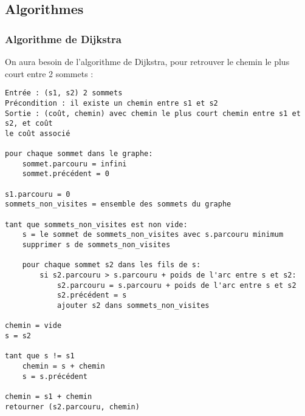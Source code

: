 \documentclass{scrartcl}
\begin{document}
  \subsection{Algorithmes}
    \subsubsection{Algorithme de Dijkstra}
      On aura besoin de l'algorithme de Dijkstra, pour retrouver le chemin
      le plus court entre 2 sommets :

      \begin{lstlisting}
Entrée : (s1, s2) 2 sommets
Précondition : il existe un chemin entre s1 et s2
Sortie : (coût, chemin) avec chemin le plus court chemin entre s1 et s2, et coût
le coût associé

pour chaque sommet dans le graphe:
    sommet.parcouru = infini
    sommet.précédent = 0

s1.parcouru = 0
sommets_non_visites = ensemble des sommets du graphe

tant que sommets_non_visites est non vide:
    s = le sommet de sommets_non_visites avec s.parcouru minimum
    supprimer s de sommets_non_visites

    pour chaque sommet s2 dans les fils de s:
        si s2.parcouru > s.parcouru + poids de l'arc entre s et s2:
            s2.parcouru = s.parcouru + poids de l'arc entre s et s2
            s2.précédent = s
            ajouter s2 dans sommets_non_visites

chemin = vide
s = s2

tant que s != s1
    chemin = s + chemin
    s = s.précédent

chemin = s1 + chemin
retourner (s2.parcouru, chemin)
      \end{lstlisting}
\end{document}
